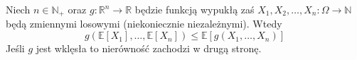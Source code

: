 \begin{fact}\label{F:Jensen} 
Niech $n\in\mathbb{N}_+$ oraz $g:\mathbb{R}^n\to\mathbb{R}$ będzie funkcją wypukłą zaś $X_1,X_2,\dots, X_n:\Omega\to\mathbb{N}$ będą zmiennymi losowymi (niekoniecznie niezależnymi). Wtedy
\[
    g(\mathbb{E}[X_1],\dots, \mathbb{E}[X_n]) \le \mathbb{E}[g(X_1,\dots,X_n)]
\]
Jeśli $g$ jest wklęsła to nierówność zachodzi w drugą stronę.
\end{fact}
